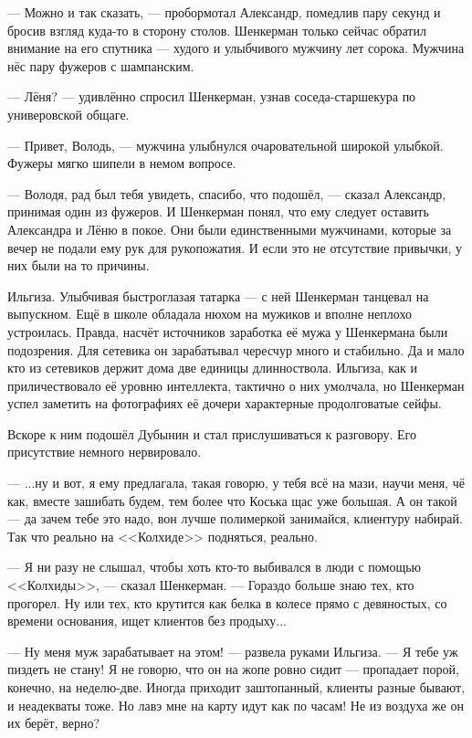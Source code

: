 --- Можно и так сказать, --- пробормотал Александр, помедлив пару секунд и бросив взгляд куда-то в сторону столов.
Шенкерман только сейчас обратил внимание на его спутника --- худого и улыбчивого мужчину лет сорока.
Мужчина нёс пару фужеров с шампанским.

--- Лёня? --- удивлённо спросил Шенкерман, узнав соседа-старшекура по универовской общаге.

--- Привет, Володь, --- мужчина улыбнулся очаровательной широкой улыбкой.
Фужеры мягко шипели в немом вопросе.

--- Володя, рад был тебя увидеть, спасибо, что подошёл, --- сказал Александр, принимая один из фужеров.
И Шенкерман понял, что ему следует оставить Александра и Лёню в покое.
Они были единственными мужчинами, которые за вечер не подали ему рук для рукопожатия.
И если это не отсутствие привычки, у них были на то причины.

Ильгиза.
Улыбчивая быстроглазая татарка --- с ней Шенкерман танцевал на выпускном.
Ещё в школе обладала нюхом на мужиков и вполне неплохо устроилась.
Правда, насчёт источников заработка её мужа у Шенкермана были подозрения.
Для сетевика он зарабатывал чересчур много и стабильно.
Да и мало кто из сетевиков держит дома две единицы длинноствола.
Ильгиза, как и приличествовало её уровню интеллекта, тактично о них умолчала, но Шенкерман успел заметить на фотографиях её дочери характерные продолговатые сейфы.

Вскоре к ним подошёл Дубынин и стал прислушиваться к разговору.
Его присутствие немного нервировало.

--- ...ну и вот, я ему предлагала, такая говорю, у тебя всё на мази, научи меня, чё как, вместе зашибать будем, тем более что Коська щас уже большая.
А он такой --- да зачем тебе это надо, вон лучше полимеркой занимайся, клиентуру набирай.
Так что реально на <<Колхиде>> подняться, реально.

--- Я ни разу не слышал, чтобы хоть кто-то выбивался в люди с помощью <<Колхиды>>, --- сказал Шенкерман.
--- Гораздо больше знаю тех, кто прогорел.
Ну или тех, кто крутится как белка в колесе прямо с девяностых, со времени основания, ищет клиентов без продыху...

--- Ну меня муж зарабатывает на этом! --- развела руками Ильгиза.
--- Я тебе уж пиздеть не стану!
Я не говорю, что он на жопе ровно сидит --- пропадает порой, конечно, на неделю-две.
Иногда приходит заштопанный, клиенты разные бывают, и неадекваты тоже.
Но лавэ мне на карту идут как по часам!
Не из воздуха же он их берёт, верно?

